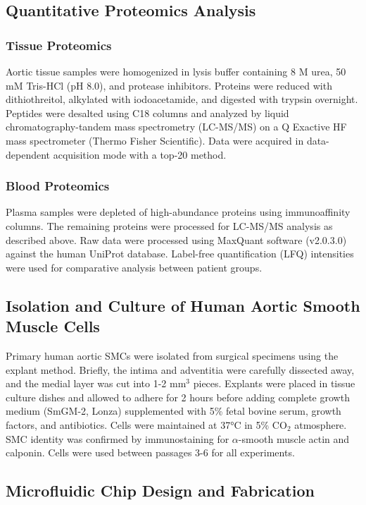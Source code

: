 \documentclass[materials,article,submit,moreauthors,pdftex]{Definitions/mdpi}
\begin{document}
\subsection{Quantitative Proteomics Analysis}

\subsubsection{Tissue Proteomics}

Aortic tissue samples were homogenized in lysis buffer containing 8 M urea, 50 mM Tris-HCl (pH 8.0), and protease inhibitors. Proteins were reduced with dithiothreitol, alkylated with iodoacetamide, and digested with trypsin overnight. Peptides were desalted using C18 columns and analyzed by liquid chromatography-tandem mass spectrometry (LC-MS/MS) on a Q Exactive HF mass spectrometer (Thermo Fisher Scientific). Data were acquired in data-dependent acquisition mode with a top-20 method.

\subsubsection{Blood Proteomics}

Plasma samples were depleted of high-abundance proteins using immunoaffinity columns. The remaining proteins were processed for LC-MS/MS analysis as described above. Raw data were processed using MaxQuant software (v2.0.3.0) against the human UniProt database. Label-free quantification (LFQ) intensities were used for comparative analysis between patient groups.

\subsection{Isolation and Culture of Human Aortic Smooth Muscle Cells}

Primary human aortic SMCs were isolated from surgical specimens using the explant method. Briefly, the intima and adventitia were carefully dissected away, and the medial layer was cut into 1-2 mm$^3$ pieces. Explants were placed in tissue culture dishes and allowed to adhere for 2 hours before adding complete growth medium (SmGM-2, Lonza) supplemented with 5\% fetal bovine serum, growth factors, and antibiotics. Cells were maintained at 37°C in 5\% CO$_2$ atmosphere. SMC identity was confirmed by immunostaining for $\alpha$-smooth muscle actin and calponin. Cells were used between passages 3-6 for all experiments.

\subsection{Microfluidic Chip Design and Fabrication}
\end{document}
